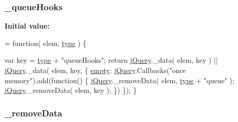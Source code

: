 \hypertarget{jquery-1_810_82-vsdoc_8js_ac896bda626b829bf9f8560a239e8f20b}{
\subsubsection[{\-\_\-queue\-Hooks}]{ \-\_\-queue\-Hooks}}\label{jquery-1_810_82-vsdoc_8js_ac896bda626b829bf9f8560a239e8f20b}
{\bfseries Initial value\-:}
\begin{DoxyCode}
= \textcolor{keyword}{function}( elem, \hyperlink{jquery-1_810_82-vsdoc_8js_a3940565e83a9bfd10d95ffd27536da91}{type} ) \{

        var key = \hyperlink{jquery-1_810_82-vsdoc_8js_a3940565e83a9bfd10d95ffd27536da91}{type} + \textcolor{stringliteral}{"queueHooks"};
        \textcolor{keywordflow}{return} \hyperlink{jquery-1_810_82-vsdoc_8js_add5237586d970a38a81f990e8eb28c6c}{jQuery}.\_data( elem, key ) || \hyperlink{jquery-1_810_82-vsdoc_8js_add5237586d970a38a81f990e8eb28c6c}{jQuery}.\_data( elem, key, \{
            \hyperlink{jquery-1_810_82-vsdoc_8js_ad242f812bdc5013e0cbf15d6e4d6800a}{empty}: \hyperlink{jquery-1_810_82-vsdoc_8js_add5237586d970a38a81f990e8eb28c6c}{jQuery}.Callbacks(\textcolor{stringliteral}{"once memory"}).add(\textcolor{keyword}{function}() \{
                \hyperlink{jquery-1_810_82-vsdoc_8js_add5237586d970a38a81f990e8eb28c6c}{jQuery}.\_removeData( elem, \hyperlink{jquery-1_810_82-vsdoc_8js_a3940565e83a9bfd10d95ffd27536da91}{type} + \textcolor{stringliteral}{"queue"} );
                \hyperlink{jquery-1_810_82-vsdoc_8js_add5237586d970a38a81f990e8eb28c6c}{jQuery}.\_removeData( elem, key );
            \})
        \});
    \}
\end{DoxyCode}
\hypertarget{jquery-1_810_82-vsdoc_8js_af9946bf86d7cfbcc033908182d2358a9}{
\subsubsection[{\-\_\-remove\-Data}]{ \-\_\-remove\-Data}}\label{jquery-1_810_82-vsdoc_8js_af9946bf86d7cfbcc033908182d2358a9}
